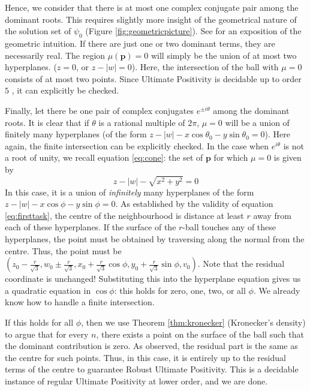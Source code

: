 Hence, we consider that there is at most one complex conjugate pair among the dominant roots. This requires slightly more insight of the geometrical nature of the solution set of $\psi_0$ (Figure \ref{fig:geometricpicture}). See \cite{originalstacs,originalarxiv} for an exposition of the geometric intuition. If there are just one or two dominant terms, they are necessarily real. The region $\mu(\mathbf{p}) = 0$ will simply be the union of at most two hyperplanes. ($z = 0$, or $z - |w| = 0$). Here, the intersection of the ball with $\mu = 0$ consists of at most two points. Since Ultimate Positivity is decidable up to order $5$ \cite{joeljames3}, it can explicitly be checked.

Finally, let there be one pair of complex conjugates $e^{\pm i\theta}$ among the dominant roots. It is clear that if $\theta$ is a rational multiple of $2\pi$, $\mu = 0$ will be a union of finitely many hyperplanes (of the form $z - |w| - x\cos \theta_0 - y\sin \theta_0 = 0$). Here again, the finite intersection can be explicitly checked. In the case when $e^{i\theta}$ is not a root of unity, we recall equation \ref{eq:cone}: the set of $\mathbf{p}$ for which $\mu = 0$ is given by
\begin{equation}
z - |w| - \sqrt{x^2 + y^2} = 0
\end{equation}
In this case, it is a union of \textit{infinitely} many hyperplanes of the form $z - |w| - x \cos \phi - y\sin \phi = 0$. As established by the validity of equation \ref{eq:firsttask}, the centre of the neighbourhood is distance at least $r$ away from each of these hyperplanes. If the surface of the $r$-ball touches any of these hyperplanes, the point must be obtained by traversing along the normal from the centre. Thus, the point must be $(z_0 - \frac{r}{\sqrt{3}}, w_0 \pm \frac{r}{\sqrt{3}}, x_0 + \frac{r}{\sqrt{3}}\cos\phi, y_0 +  \frac{r}{\sqrt{3}}\sin\phi, v_0)$. Note that the residual coordinate is unchanged! Substituting this into the hyperplane equation gives us a quadratic equation in $\cos \phi$: this holds for zero, one, two, or all $\phi$. We already know how to handle a finite intersection.

If this holds for all $\phi$, then we use Theorem \ref{thm:kronecker} (Kronecker's density) to argue that for every $n$, there exists a point on the surface of the ball such that the dominant contribution is zero. As observed, the residual part is the same as the centre for such points. Thus, in this case, it is entirely up to the residual terms of the centre to guarantee Robust Ultimate Positivity. This is a decidable instance of regular Ultimate Positivity at lower order, and we are done.
